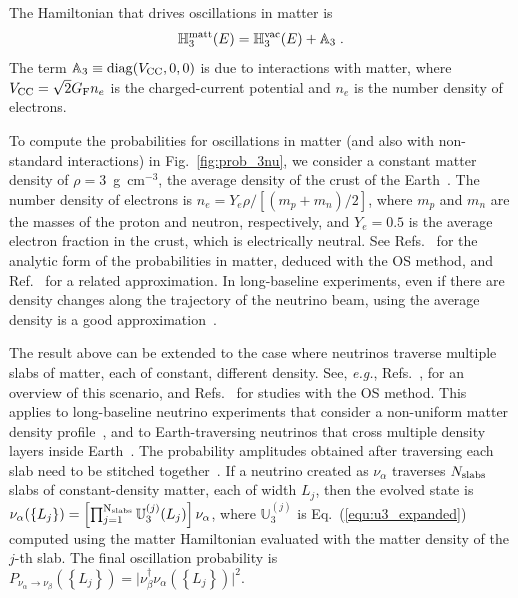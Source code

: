\documentclass[final,5p,times,twocolumn]{elsarticle}
\newcommand{\eg}{{\it e.g.}}
\newcommand{\eq}{Eq.}
\newcommand{\fig}{Fig.}
\newcommand{\Ref}{Ref.}
\newcommand{\Refs}{Refs.}
\newcommand{\equ}[1]{\eq~(\ref{equ:#1})}
\newcommand{\figu}[1]{\fig~\ref{fig:#1}}
\begin{document}
The Hamiltonian that drives oscillations in matter is
\begin{equation}
 \label{equ:h3_matt}
 \mathbb{H}_3^{\rm matt}(E)
 = 
 \mathbb{H}_3^{\rm vac}(E) + \mathbb{A}_3 \;.
\end{equation}
The term $\mathbb{A}_3 \equiv {\rm diag}(V_{\rm CC}, 0 ,0)$ is due to interactions with matter, where $V_{\rm CC} = \sqrt{2} G_{\rm F} n_e$ is the charged-current potential and $n_e$ is the number density of electrons.

To compute the probabilities for oscillations in matter (and also with non-standard interactions) in \figu{prob_3nu}, we consider a constant matter density of $\rho = 3$~g~cm$^{-3}$, the average density of the crust of the Earth\ \cite{Dziewonski:1981xy}.  The number density of electrons is $n_e = Y_e \rho / [(m_p + m_n)/2]$, where $m_p$ and $m_n$ are the masses of the proton and neutron, respectively, and $Y_e = 0.5$ is the average electron fraction in the crust, which is electrically neutral.  See \Refs\ \cite{Ohlsson:1999xb, Ohlsson:1999um} for the analytic form of the probabilities in matter, deduced with the OS method, and \Ref\ \cite{Freund:2001pn} for a related approximation.  In long-baseline experiments, even if there are density changes along the trajectory of the neutrino beam, using the average density is a good approximation\ \cite{Petcov:1998su, Freund:1999gy}.  

The result above can be extended to the case where neutrinos traverse multiple slabs of matter, each of constant, different density.  See, \eg, \Refs\ \cite{Chizhov:1999az, Chizhov:1999he}, for an overview of this scenario, and \Refs\ \cite{Ohlsson:1999um, Ohlsson:2001et, Merfeld:2014cha} for studies with the OS method.  This applies to long-baseline neutrino experiments that consider a non-uniform matter density profile\ \cite{Jacobsson:2001zk, Ohlsson:2003ip, Arguelles:2012nw, Roe:2017zdw, Kelly:2018kmb}, and to Earth-traversing neutrinos that cross multiple density layers inside Earth\ \cite{Freund:1999vc}.  The probability amplitudes obtained after traversing each slab need to be stitched together\ \cite{Giunti:2007ry}.  If a neutrino created as $\nu_\alpha$ traverses $N_{\rm slabs}$ slabs of constant-density matter, each of width $L_j$, then the evolved state is $\nu_\alpha(\left\{L_j\right\}) = \left[ \prod_{j=1}^{\rm N_{\rm slabs}} \mathbb{U}_3^{(j)}(L_j) \right] \nu_\alpha$, where $\mathbb{U}_3^{(j)}$ is \equ{u3_expanded} computed using the matter Hamiltonian evaluated with the matter density of the $j$-th slab.  The final oscillation probability is $P_{\nu_\alpha \to \nu_\beta}(\left\{ L_j \right\}) = \lvert \nu_\beta^\dagger \nu_\alpha(\left\{L_j\right\}) \rvert^2$.
\end{document}
